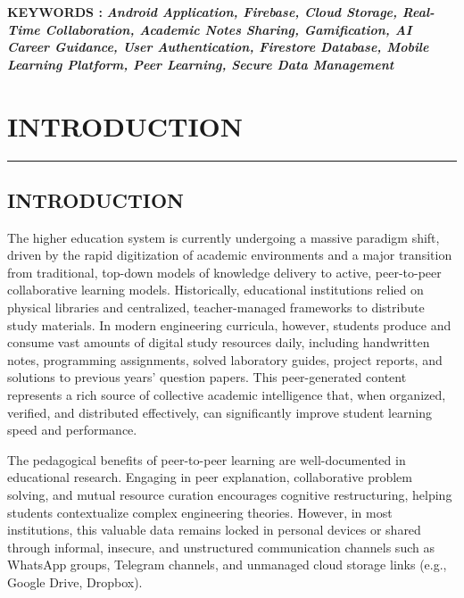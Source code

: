 \documentclass[12,Times new Roman,a4paper]{report}
\begin{document}
\noindent \textbf{KEYWORDS :} \textbf{\textit{Android Application, Firebase, Cloud Storage, Real-Time Collaboration, Academic Notes Sharing, Gamification, AI Career Guidance, User Authentication, Firestore Database, Mobile Learning Platform, Peer Learning, Secure Data Management}}
\clearpage
\hypersetup{pageanchor=true}
\tableofcontents
\listoffigures
\listoftables
\chapter{INTRODUCTION}
\rule{\textwidth}{1pt}
\paragraph{}
\section{INTRODUCTION}

The higher education system is currently undergoing a massive paradigm shift, driven by the rapid digitization of academic environments and a major transition from traditional, top-down models of knowledge delivery to active, peer-to-peer collaborative learning models. Historically, educational institutions relied on physical libraries and centralized, teacher-managed frameworks to distribute study materials. In modern engineering curricula, however, students produce and consume vast amounts of digital study resources daily, including handwritten notes, programming assignments, solved laboratory guides, project reports, and solutions to previous years' question papers. This peer-generated content represents a rich source of collective academic intelligence that, when organized, verified, and distributed effectively, can significantly improve student learning speed and performance.

The pedagogical benefits of peer-to-peer learning are well-documented in educational research. Engaging in peer explanation, collaborative problem solving, and mutual resource curation encourages cognitive restructuring, helping students contextualize complex engineering theories. However, in most institutions, this valuable data remains locked in personal devices or shared through informal, insecure, and unstructured communication channels such as WhatsApp groups, Telegram channels, and unmanaged cloud storage links (e.g., Google Drive, Dropbox).
\end{document}
